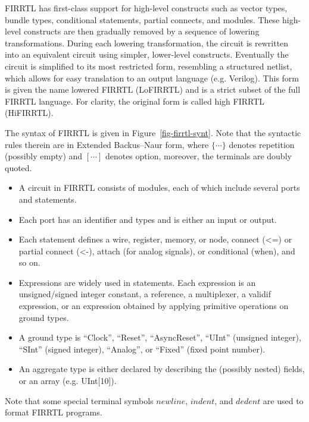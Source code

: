 

FIRRTL has first-class support for high-level constructs such as vector types, bundle types, conditional statements, partial connects, and modules. These high-level constructs are then gradually removed by a sequence of lowering transformations. During each lowering transformation, the circuit is rewritten into an equivalent circuit using simpler, lower-level
constructs. Eventually the circuit is simplified to its most restricted form, resembling a structured netlist, which allows for easy translation to an output language (e.g. Verilog). This form is given the name lowered FIRRTL (LoFIRRTL) and is a strict subset of the full FIRRTL language. For clarity, the original form is called high FIRRTL (HiFIRRTL). 

The syntax of FIRRTL is given in Figure~\ref{fig-firrtl-synt}.  Note that the syntactic rules therein are in Extended Backus–Naur form, where $\{\cdots\}$ denotes repetition (possibly empty) and $[\cdots]$ denotes option, moreover, the terminals are doubly quoted. 




\begin{itemize}
\item A circuit in FIRRTL consists of modules, each of which include several ports and statements. 
\item Each port has an identifier and types and is either an input or output. 
\item Each statement defines a wire, register, memory, or node, connect (<=) or partial connect (<-), attach (for analog signals), or conditional (when), and so on.  
\item Expressions are widely used in statements. Each expression is an unsigned/signed integer constant, a reference, a multiplexer, a validif expression, or an expression obtained by applying primitive operations on ground types. 
\item A ground type is ``Clock'', ``Reset'', ``AsyncReset'', ``UInt'' (unsigned integer), ``SInt'' (signed integer), ``Analog'', or ``Fixed'' (fixed point number).  
\item An aggregate type is either declared by describing the (possibly nested) fields, or an array (e.g. UInt[10]).
\end{itemize}
Note that some special terminal symbols $newline$, $indent$, and $dedent$ are used to format FIRRTL programs. 

